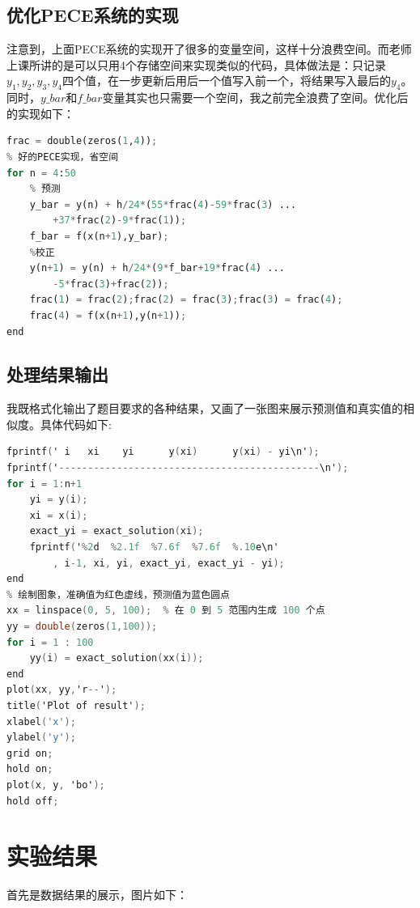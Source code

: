\documentclass{LabReport}
\begin{document}
	\subsection{优化PECE系统的实现}
	注意到，上面PECE系统的实现开了很多的变量空间，这样十分浪费空间。而老师上课所讲的是可以只用4个存储空间来实现类似的代码，具体做法是：只记录$y_1,y_2,y_3,y_4$四个值，在一步更新后用后一个值写入前一个，将结果写入最后的$y_4$。同时，$y\_bar$和$f\_bar$变量其实也只需要一个空间，我之前完全浪费了空间。优化后的实现如下：
	\begin{lstlisting}[language=python,frame=shadowbox]
% 好的实现，frac这个存储预测值的地方只需要4个空间
frac = double(zeros(1,4));
% 好的PECE实现，省空间
for n = 4:50
	% 预测
	y_bar = y(n) + h/24*(55*frac(4)-59*frac(3) ...
		+37*frac(2)-9*frac(1));
	f_bar = f(x(n+1),y_bar);
	%校正
	y(n+1) = y(n) + h/24*(9*f_bar+19*frac(4) ...
		-5*frac(3)+frac(2));
	frac(1) = frac(2);frac(2) = frac(3);frac(3) = frac(4);
	frac(4) = f(x(n+1),y(n+1));
end
	\end{lstlisting}
	
	
	\subsection{处理结果输出}
	我既格式化输出了题目要求的各种结果，又画了一张图来展示预测值和真实值的相似度。具体代码如下:
	\begin{lstlisting}[language=C,frame=shadowbox]
% 格式化输出结果,结果通过命令行窗口查看，空格符号显示了出来
fprintf(' i   xi    yi      y(xi)      y(xi) - yi\n');
fprintf('---------------------------------------------\n');
for i = 1:n+1
	yi = y(i);
	xi = x(i);
	exact_yi = exact_solution(xi);
	fprintf('%2d  %2.1f  %7.6f  %7.6f  %.10e\n'
		, i-1, xi, yi, exact_yi, exact_yi - yi);
end
% 绘制图象，准确值为红色虚线，预测值为蓝色圆点
xx = linspace(0, 5, 100);  % 在 0 到 5 范围内生成 100 个点
yy = double(zeros(1,100));
for i = 1 : 100
	yy(i) = exact_solution(xx(i));
end
plot(xx, yy,'r--');
title('Plot of result');
xlabel('x');
ylabel('y');
grid on;
hold on;
plot(x, y, 'bo');  
hold off;
	\end{lstlisting}
	
\section{实验结果}
首先是数据结果的展示，图片如下：
\end{document}
